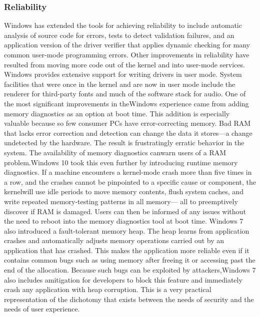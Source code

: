 \documentclass[12pt]{article}
\begin{document}
\subsubsection*{Reliability}
Windows has extended
the tools for achieving reliability to include automatic analysis of source code
for errors, tests to detect validation failures, and an application version of the driver verifier that applies dynamic checking for many common user-mode
programming errors. Other improvements in reliability have resulted from
moving more code out of the kernel and into user-mode services. Windows
provides extensive support for writing drivers in user mode. System facilities
that were once in the kernel and are now in user mode include the renderer for
third-party fonts and much of the software stack for audio.
One of the most significant improvements in theWindows experience came
from adding memory diagnostics as an option at boot time. This addition is
especially valuable because so few consumer PCs have error-correcting memory.
Bad RAM that lacks error correction and detection can change the data
it stores—a change undetected by the hardware. The result is frustratingly
erratic behavior in the system. The availability of memory diagnostics canwarn
users of a RAM problem.Windows 10 took this even further by introducing runtime
memory diagnostics. If a machine encounters a kernel-mode crash more
than five times in a row, and the crashes cannot be pinpointed to a specific cause
or component, the kernelwill use idle periods to move memory contents, flush
system caches, and write repeated memory-testing patterns in all memory—
all to preemptively discover if RAM is damaged. Users can then be informed of
any issues without the need to reboot into the memory diagnostics tool at boot
time. Windows 7 also introduced a fault-tolerant memory heap. The heap learns
from application crashes and automatically adjusts memory operations carried
out by an application that has crashed. This makes the application more reliable
even if it contains common bugs such as using memory after freeing it or
accessing past the end of the allocation. Because such bugs can be exploited
by attackers,Windows 7 also includes amitigation for developers to block this
feature and immediately crash any application with heap corruption. This is a
very practical representation of the dichotomy that exists between the needs of
security and the needs of user experience.
\end{document}
